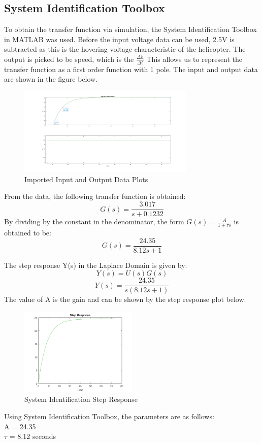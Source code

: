 \documentclass[12pt]{article}
\begin{document}
\subsection{\Large{System Identification Toolbox}}
To obtain the transfer function via simulation, the System Identification Toolbox in MATLAB was used. Before the input voltage data can be used, 2.5V is subtracted as this is the hovering voltage characteristic of the helicopter. The output is picked to be speed, which is the \( \frac{\Delta h}{\Delta t} \) This allows us to represent the transfer function as a first order function with 1 pole. The input and output data are shown in the figure below.

\begin{figure}[H]
     \centering
     \includegraphics[width=0.75\textwidth]{inputvsoutput.png}
     \caption{Imported Input and Output Data Plots}
     \label{fig:sample}
 \end{figure}

From the data, the following transfer function is obtained:
\[
    G(s) = \frac{3.017}{s+0.1232}
\]
By dividing by the constant in the denominator, the form \( G(s) = \frac{A}{1+ \tau s} \) is obtained to be:
\[
    G(s) = \frac{24.35}{8.12s+1}
\]

The step response Y(s) in the Laplace Domain is given by:
\[
    Y(s) = U(s)G(s)
\]
\[
    Y(s) = \frac{24.35}{s(8.12s+1)}
\]
The value of A is the gain and can be shown by the step response plot below.
\begin{figure}[H]
     \centering
     \includegraphics[width=0.5\textwidth]{step response.png}
     \caption{System Identification Step Response}
     \label{fig:sample}
 \end{figure}
Using System Identification Toolbox, the parameters are as follows: \\
A = 24.35 \\
\(\tau \) = 8.12 seconds
\newpage
\end{document}
